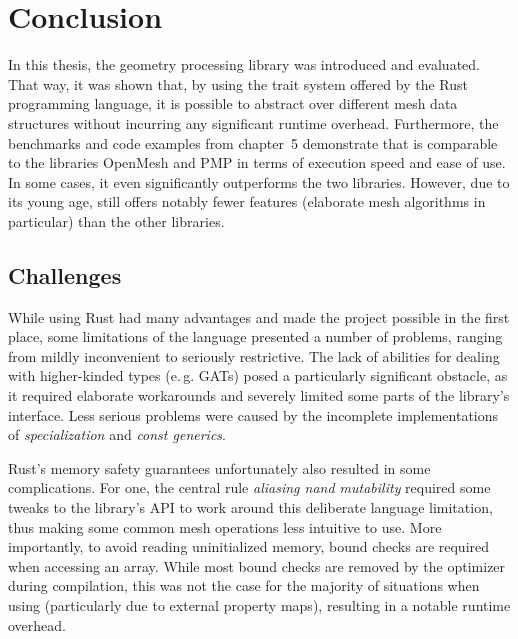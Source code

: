 \chapter{Conclusion}

In this thesis, the geometry processing library  was introduced and evaluated.
That way, it was shown that, by using the trait system offered by the Rust programming language,  it is possible to abstract over different mesh data structures without incurring any significant runtime overhead.
Furthermore, the benchmarks and code examples from chapter~5 demonstrate that  is comparable to the \cpp libraries OpenMesh and PMP in terms of execution speed and ease of use.
In some cases, it even significantly outperforms the two \cpp libraries.
However, due to its young age,  still offers notably fewer features (elaborate mesh algorithms in particular) than the other libraries.



\vfill
\section{Challenges}

While using Rust had many advantages and made the project possible in the first place, some limitations of the language presented a number of problems, ranging from mildly inconvenient to seriously restrictive.
The lack of abilities for dealing with higher-kinded types (e.\,g. GATs) posed a particularly significant obstacle, as it required elaborate workarounds and severely limited some parts of the library's interface.
Less serious problems were caused by the incomplete implementations of \emph{specialization} and \emph{const generics}.

Rust's memory safety guarantees unfortunately also resulted in some complications.
For one, the central rule \emph{aliasing nand mutability} required some tweaks to the library's API to work around this deliberate language limitation, thus making some common mesh operations less intuitive to use.
More importantly, to avoid reading uninitialized memory, bound checks are required when accessing an array.
While most bound checks are removed by the optimizer during compilation, this was not the case for the majority of situations when using  (particularly due to external property maps), resulting in a notable runtime overhead.


